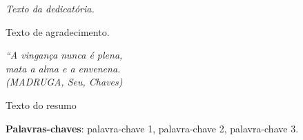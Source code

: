 \documentclass[
	12pt,				%
	openright,			%
	oneside,			%
	a4paper,			%
	english,			%
	brazil				%
	]{abntex2}
\begin{document}
\frenchspacing

\imprimircapa

\imprimirfolhaderosto

 \begin{dedicatoria}
   \vspace*{\fill}
   \centering
   \noindent
   \textit{ Texto da dedicatória.} \vspace*{\fill}
 \end{dedicatoria}

 \begin{agradecimentos}
 Texto de agradecimento.

 \end{agradecimentos}

 \begin{epigrafe}
     \vspace*{\fill}
 	\begin{flushright}
 		\textit{``A vingança nunca é plena, \\
 		mata a alma e a envenena. \\
 		(MADRUGA, Seu, Chaves)}
 	\end{flushright}
 \end{epigrafe}

\setlength{\absparsep}{18pt} %
\begin{resumo}

Texto do resumo

\textbf{Palavras-chaves}: palavra-chave 1, palavra-chave 2, palavra-chave 3.
\end{resumo}
\end{document}
